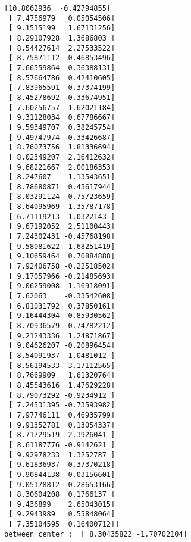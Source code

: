 \documentclass[11pt]{article}
\begin{document}
\begin{Verbatim}[commandchars=\\\{\}]
 [10.8062936  -0.42794855]
 [ 7.4756979   0.05054506]
 [ 9.1515199   1.67131256]
 [ 8.29107928  1.3686803 ]
 [ 8.54427614  2.27533522]
 [ 8.75871112 -0.46853496]
 [ 7.66559864  0.36388131]
 [ 8.57664786  0.42410605]
 [ 7.83965591  0.37374199]
 [ 8.45278692 -0.33674951]
 [ 7.60256757  1.62021184]
 [ 9.31128034  0.67786667]
 [ 9.59349707  0.38245754]
 [ 9.49747974  0.33426687]
 [ 8.76073756  1.81336694]
 [ 8.02349207  2.16412632]
 [ 9.68221667  2.00186353]
 [ 8.247607    1.13543651]
 [ 8.78680871  0.45617944]
 [ 8.03291124  0.75723659]
 [ 8.64095969  1.35787178]
 [ 6.71119213  1.0322143 ]
 [ 9.67192052  2.51100443]
 [ 7.24302431 -0.45768198]
 [ 9.58081622  1.68251419]
 [ 9.10659464  0.70884888]
 [ 7.92406758 -0.22518502]
 [ 9.17057966 -0.21485693]
 [ 9.06259008  1.16918091]
 [ 7.62063    -0.33542608]
 [ 6.81031792  0.37850161]
 [ 9.16444304  0.85930562]
 [ 8.70936579  0.74782212]
 [ 9.21243336  1.24871867]
 [ 9.04626207 -0.20896454]
 [ 8.54091937  1.0481012 ]
 [ 8.56194533  3.17112565]
 [ 8.7669909   1.61320764]
 [ 8.45543616  1.47629228]
 [ 8.79073292 -0.9234912 ]
 [ 7.24531395 -0.73593982]
 [ 7.97746111  0.46935799]
 [ 9.91352781  0.13054337]
 [ 8.71729519  2.3926041 ]
 [ 8.61187776 -0.9142621 ]
 [ 9.92978233  1.3252787 ]
 [ 9.61836937  0.37370218]
 [ 9.90844138  0.03156601]
 [ 9.05178812 -0.28653166]
 [ 8.30604208  0.1766137 ]
 [ 9.436899    2.65043015]
 [ 9.2943989   0.55848064]
 [ 7.35104595  0.16400712]] 
between center :  [ 8.30435822 -1.70702104] 


\end{Verbatim}
\end{document}
